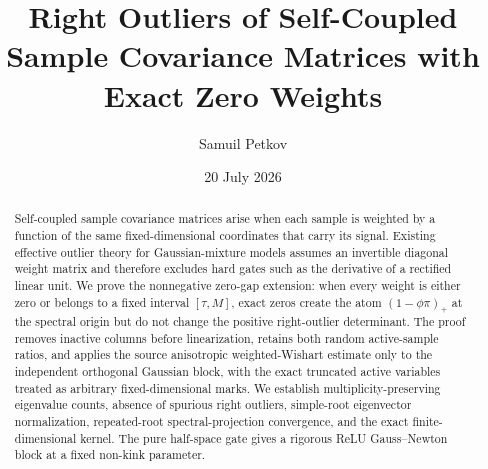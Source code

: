 \documentclass[
  aps,
  prl,
  reprint,
  onecolumn,
  superscriptaddress,
  longbibliography,
  nofootinbib
]{revtex4-2}
\theoremstyle{remark}
\numberwithin{equation}{section}
\begin{document}
\title{Right Outliers of Self-Coupled Sample Covariance Matrices with Exact Zero Weights}

\author{Samuil Petkov}

\date{20 July 2026}

\begin{abstract}
Self-coupled sample covariance matrices arise when each sample is weighted by a function of the same fixed-dimensional coordinates that carry its signal. Existing effective outlier theory for Gaussian-mixture models assumes an invertible diagonal weight matrix and therefore excludes hard gates such as the derivative of a rectified linear unit. We prove the nonnegative zero-gap extension: when every weight is either zero or belongs to a fixed interval $[\tau,M]$, exact zeros create the atom $(1-\phi\pi)_+$ at the spectral origin but do not change the positive right-outlier determinant. The proof removes inactive columns before linearization, retains both random active-sample ratios, and applies the source anisotropic weighted-Wishart estimate only to the independent orthogonal Gaussian block, with the exact truncated active variables treated as arbitrary fixed-dimensional marks. We establish multiplicity-preserving eigenvalue counts, absence of spurious right outliers, simple-root eigenvector normalization, repeated-root spectral-projection convergence, and the exact finite-dimensional kernel. The pure half-space gate gives a rigorous ReLU Gauss--Newton block at a fixed non-kink parameter.
\end{abstract}

\maketitle
\end{document}
